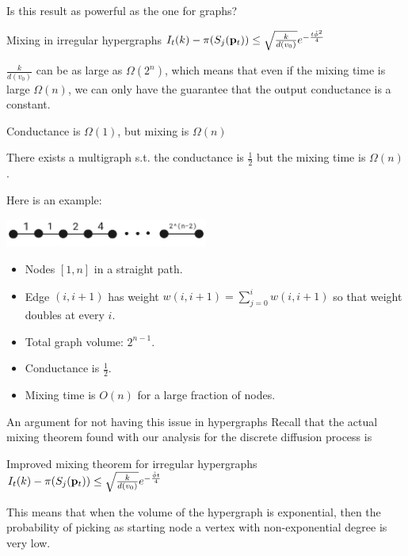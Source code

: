 \documentclass[../main.tex]{subfiles}
\begin{document}
    \begin{frame}{Is this result as powerful as the one for graphs?} 
    	
		\begin{block}{Mixing in irregular hypergraphs}
			$I_t(k) - \pi(S_j(\bold{p}_{t})) \leq \sqrt{\frac{k}{d(v_0)}} e^{-\frac{t\hat{\phi}^2}{4}}$
		\end{block}
	
		$\frac{k}{d(v_0)}$ can be as large as $\Omega(2^n)$, which means that even if the mixing time is large $\Omega(n)$, we can only have the guarantee that the output conductance is a constant.    
	\end{frame}	

	\begin{frame}{Conductance is $\Omega(1)$, but mixing is $\Omega(n)$}
		\begin{lemma}
			There exists a multigraph s.t. the conductance is $\frac{1}{2}$ but the mixing time is $\Omega(n)$.
		\end{lemma}
		Here is an example: \\ 
		\begin{center}
		\includegraphics[width=0.5\textwidth]{Figures/path_graph}
		\end{center}
		\begin{itemize}
			\item Nodes $[1,n]$ in a straight path.
			\item Edge $(i,i+1)$ has weight $w(i,i+1) = \sum_{j=0}^{i} w(i,i+1)$ so that weight doubles at every $i$.
			\item Total graph volume: $2^{n-1}$.
			\item Conductance is $\frac{1}{2}$.
			\item Mixing time is $O(n)$ for a large fraction of nodes.
		\end{itemize}
	\end{frame}

	\begin{frame}{An argument for not having this issue in hypergraphs}
		Recall that the actual mixing theorem found with our analysis for the discrete diffusion process is
		\begin{block}{Improved mixing theorem for irregular hypergraphs}
			$I_t(k) - \pi(S_j(\bold{p}_t)) \leq \sqrt{\frac{k}{d(v_0)}}e^{-\frac{\hat{\phi}t}{
			4}}$
		\end{block}
		This means that when the volume of the hypergraph is exponential, then the probability of picking as starting node a vertex with non-exponential degree is very low.
	\end{frame}
\end{document}
